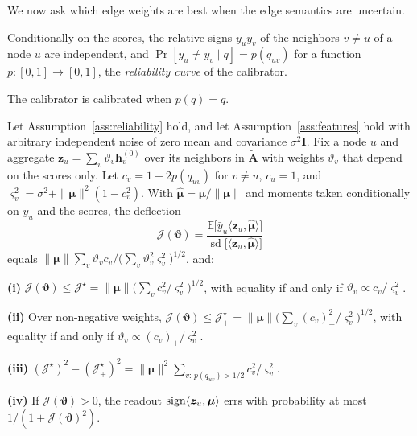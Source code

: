 We now ask which edge weights are best when the edge semantics are uncertain.

\begin{assumption}\label{ass:reliability}
Conditionally on the scores, the relative signs $\bar y_u\bar y_v$ of the neighbors $v\neq u$ of a node $u$ are independent, and $\Pr[y_u\neq y_v\mid q]=p(q_{uv})$ for a function $p:[0,1]\to[0,1]$, the \emph{reliability curve} of the calibrator.
\end{assumption}

The calibrator is calibrated when $p(q)=q$.

\begin{theorem}\label{thm:optimal}
Let Assumption~\ref{ass:reliability} hold, and let Assumption~\ref{ass:features} hold with arbitrary independent noise of zero mean and covariance $\sigma^2\bm I$.
Fix a node $u$ and aggregate $\bm z_u=\sum_v\vartheta_v\bm h^{(0)}_v$ over its neighbors in $\tilde{\bm A}$ with weights $\vartheta_v$ that depend on the scores only.
Let $c_v=1-2p(q_{uv})$ for $v\neq u$, $c_u=1$, and $\varsigma_v^2=\sigma^2+\|\bm\mu\|^2(1-c_v^2)$.
With $\hat{\bm\mu}=\bm\mu/\|\bm\mu\|$ and moments taken conditionally on $y_u$ and the scores, the deflection
\[
\mathcal J(\bm\vartheta)
=\frac{\mathbb E\bigl[\bar y_u\langle\bm z_u,\hat{\bm\mu}\rangle\bigr]}{\operatorname{sd}\bigl[\langle\bm z_u,\hat{\bm\mu}\rangle\bigr]}
\]
equals $\|\bm\mu\|\sum_v\vartheta_vc_v\big/\bigl(\sum_v\vartheta_v^2\varsigma_v^2\bigr)^{1/2}$, and:

\smallskip\noindent\textbf{(i)} $\mathcal J(\bm\vartheta)\le\mathcal J^\star=\|\bm\mu\|\bigl(\sum_vc_v^2/\varsigma_v^2\bigr)^{1/2}$, with equality if and only if $\vartheta_v\propto c_v/\varsigma_v^2$.

\smallskip\noindent\textbf{(ii)} Over non-negative weights, $\mathcal J(\bm\vartheta)\le\mathcal J^\star_+=\|\bm\mu\|\bigl(\sum_v(c_v)_+^2/\varsigma_v^2\bigr)^{1/2}$, with equality if and only if $\vartheta_v\propto(c_v)_+/\varsigma_v^2$.

\smallskip\noindent\textbf{(iii)} $(\mathcal J^\star)^2-(\mathcal J^\star_+)^2=\|\bm\mu\|^2\sum_{v:\,p(q_{uv})>1/2}c_v^2/\varsigma_v^2$.

\smallskip\noindent\textbf{(iv)} If $\mathcal J(\bm\vartheta)>0$, the readout $\operatorname{sign}\langle\bm z_u,\bm\mu\rangle$ errs with probability at most $1/(1+\mathcal J(\bm\vartheta)^2)$.
\end{theorem}

